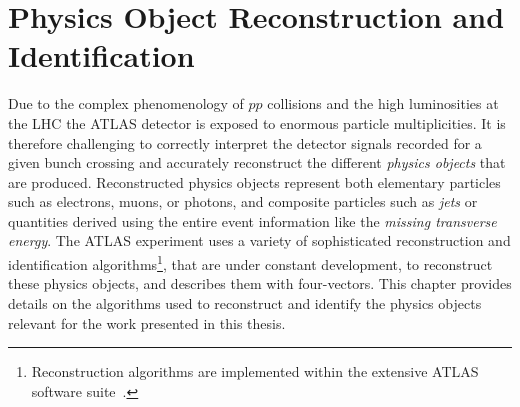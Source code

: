 
\chapter{Physics Object Reconstruction and Identification}
\label{chap:objects}

Due to the complex phenomenology of $pp$ collisions and the high luminosities at the LHC the ATLAS detector is exposed to enormous particle multiplicities. It is therefore challenging to correctly interpret the detector signals recorded for a given bunch crossing and accurately reconstruct the different \emph{physics objects} that are produced.
Reconstructed physics objects represent both elementary particles such as electrons, muons, or photons, and composite particles such as \emph{jets} or quantities derived using the entire event information like the \emph{missing transverse energy}.
The ATLAS experiment uses a variety of sophisticated reconstruction and identification algorithms\footnote{Reconstruction algorithms are implemented within the extensive ATLAS software suite~\cite{ATL-SOFT-PUB-2021-001}.}, that are under constant development, to reconstruct these physics objects, and describes them with four-vectors.
This chapter provides details on the algorithms used to reconstruct and identify the physics objects relevant for the work presented in this thesis.



